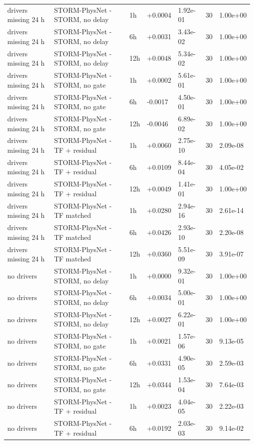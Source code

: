 \begin{tabular}{lllllrl}
drivers missing 24 h & STORM-PhysNet - STORM, no delay & 1h & +0.0004 & 1.92e-01 & 30 & 1.00e+00 \\
drivers missing 24 h & STORM-PhysNet - STORM, no delay & 6h & +0.0031 & 3.43e-02 & 30 & 1.00e+00 \\
drivers missing 24 h & STORM-PhysNet - STORM, no delay & 12h & +0.0048 & 5.34e-02 & 30 & 1.00e+00 \\
drivers missing 24 h & STORM-PhysNet - STORM, no gate & 1h & +0.0002 & 5.61e-01 & 30 & 1.00e+00 \\
drivers missing 24 h & STORM-PhysNet - STORM, no gate & 6h & -0.0017 & 4.50e-01 & 30 & 1.00e+00 \\
drivers missing 24 h & STORM-PhysNet - STORM, no gate & 12h & -0.0046 & 6.89e-02 & 30 & 1.00e+00 \\
drivers missing 24 h & STORM-PhysNet - TF + residual & 1h & +0.0060 & 2.75e-10 & 30 & 2.09e-08 \\
drivers missing 24 h & STORM-PhysNet - TF + residual & 6h & +0.0109 & 8.44e-04 & 30 & 4.05e-02 \\
drivers missing 24 h & STORM-PhysNet - TF + residual & 12h & +0.0049 & 1.41e-01 & 30 & 1.00e+00 \\
drivers missing 24 h & STORM-PhysNet - TF matched & 1h & +0.0280 & 2.94e-16 & 30 & 2.61e-14 \\
drivers missing 24 h & STORM-PhysNet - TF matched & 6h & +0.0426 & 2.93e-10 & 30 & 2.20e-08 \\
drivers missing 24 h & STORM-PhysNet - TF matched & 12h & +0.0360 & 5.51e-09 & 30 & 3.91e-07 \\
no drivers & STORM-PhysNet - STORM, no delay & 1h & +0.0000 & 9.32e-01 & 30 & 1.00e+00 \\
no drivers & STORM-PhysNet - STORM, no delay & 6h & +0.0034 & 5.00e-01 & 30 & 1.00e+00 \\
no drivers & STORM-PhysNet - STORM, no delay & 12h & +0.0027 & 6.22e-01 & 30 & 1.00e+00 \\
no drivers & STORM-PhysNet - STORM, no gate & 1h & +0.0021 & 1.57e-06 & 30 & 9.13e-05 \\
no drivers & STORM-PhysNet - STORM, no gate & 6h & +0.0331 & 4.90e-05 & 30 & 2.59e-03 \\
no drivers & STORM-PhysNet - STORM, no gate & 12h & +0.0344 & 1.53e-04 & 30 & 7.64e-03 \\
no drivers & STORM-PhysNet - TF + residual & 1h & +0.0023 & 4.04e-05 & 30 & 2.22e-03 \\
no drivers & STORM-PhysNet - TF + residual & 6h & +0.0192 & 2.03e-03 & 30 & 9.14e-02 \\

\end{tabular}
